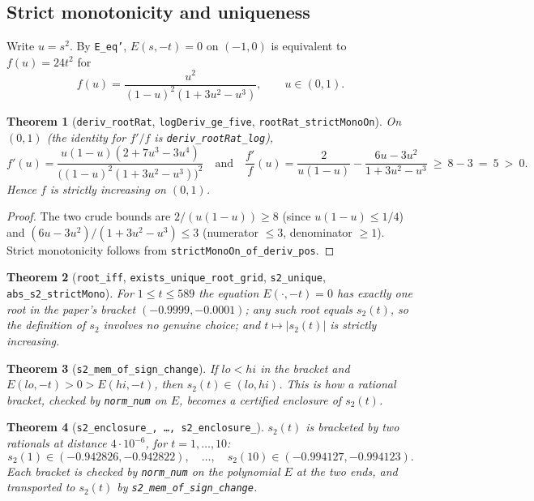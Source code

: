 \documentclass[11pt,a4paper]{article}
\newcommand{\lb}{\_\allowbreak}
\newcommand{\code}[1]{\texttt{#1}}
\newtheorem{theorem}{Theorem}[section]
\theoremstyle{definition}
\theoremstyle{remark}
\begin{document}
\subsection{Strict monotonicity and uniqueness}

Write $u=s^2$.  By \code{E\lb eq'}, $E(s,-t)=0$ on $(-1,0)$ is equivalent to $f(u)=24t^2$ for
\[
  f(u)=\frac{u^2}{(1-u)^2(1+3u^2-u^3)},\qquad u\in(0,1).
\]

\begin{theorem}[\code{deriv\lb rootRat}, \code{logDeriv\lb ge\lb five},
\code{rootRat\lb strictMonoOn}]
On $(0,1)$ (the identity for $f'/f$ is \code{deriv\lb rootRat\lb log}),
\[
  f'(u)=\frac{u(1-u)(2+7u^3-3u^4)}{\bigl((1-u)^2(1+3u^2-u^3)\bigr)^2}
  \quad\text{and}\quad
  \frac{f'}{f}(u)=\frac{2}{u(1-u)}-\frac{6u-3u^2}{1+3u^2-u^3}\ \ge\ 8-3\ =\ 5\ >\ 0 .
\]
Hence $f$ is strictly increasing on $(0,1)$.
\end{theorem}
\begin{proof}
The two crude bounds are $2/(u(1-u))\ge8$ (since $u(1-u)\le1/4$) and
$(6u-3u^2)/(1+3u^2-u^3)\le3$ (numerator $\le3$, denominator $\ge1$).  Strict monotonicity
follows from \code{strictMonoOn\lb of\lb deriv\lb pos}.
\end{proof}

\begin{theorem}[\code{root\lb iff}, \code{exists\lb unique\lb root\lb grid}, \code{s2\lb unique},
\code{abs\lb s2\lb strictMono}]
For $1\le t\le589$ the equation $E(\cdot,-t)=0$ has exactly one root in the paper's bracket
$(-0.9999,-0.0001)$; any such root equals $s_2(t)$, so the definition of $s_2$ involves no
genuine choice; and $t\mapsto|s_2(t)|$ is strictly increasing.
\end{theorem}

\begin{theorem}[\code{s2\lb mem\lb of\lb sign\lb change}]
If $lo<hi$ in the bracket and $E(lo,-t)>0>E(hi,-t)$, then $s_2(t)\in(lo,hi)$.  This is how a
rational bracket, checked by \code{norm\lb num} on $E$, becomes a certified enclosure of
$s_2(t)$.
\end{theorem}

\begin{theorem}[\code{s2\lb enclosure\lb 1, \dots, s2\lb enclosure\lb 10}]
$s_2(t)$ is bracketed by two rationals at distance $4\cdot10^{-6}$, for $t=1,\dots,10$:
\[
  s_2(1)\in(-0.942826,-0.942822),\quad \dots,\quad
  s_2(10)\in(-0.994127,-0.994123).
\]
Each bracket is checked by \code{norm\lb num} on the polynomial $E$ at the two ends, and
transported to $s_2(t)$ by \code{s2\lb mem\lb of\lb sign\lb change}.
\end{theorem}
\end{document}
